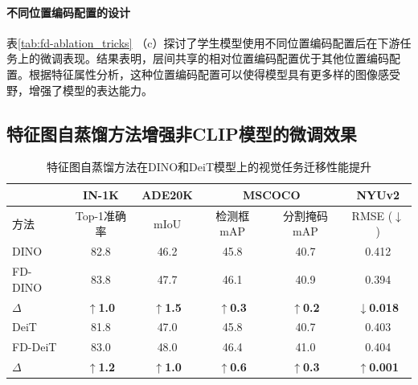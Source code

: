 \paragraph{不同位置编码配置的设计} 表\ref{tab:fd-ablation_tricks} （c）探讨了学生模型使用不同位置编码配置后在下游任务上的微调表现。结果表明，层间共享的相对位置编码配置优于其他位置编码配置。根据特征属性分析，这种位置编码配置可以使得模型具有更多样的图像感受野，增强了模型的表达能力。

\subsection{特征图自蒸馏方法增强非CLIP模型的微调效果}
\label{sec:fd-more-models}


\begin{table}
\caption{
特征图自蒸馏方法在DINO和DeiT模型上的视觉任务迁移性能提升
}
\centering
  \begin{tabular}{lccccc}
\toprule
   & IN-1K & ADE20K & \multicolumn{2}{c}{MSCOCO} & NYUv2 \\
   \midrule
方法    &  Top-1准确率   &  mIoU  & 检测框mAP & 分割掩码mAP & RMSE\scriptsize{ ($\downarrow$)}\\
  \midrule
  DINO & 82.8 & 46.2 & 45.8 & 40.7 & 0.412 \\
  FD-DINO & 83.8 & 47.7 & 46.1 & 40.9 & 0.394 \\
  $\Delta$ & \textbf{$\uparrow$1.0} & \textbf{$\uparrow$1.5} & \textbf{$\uparrow$0.3} & \textbf{$\uparrow$0.2} & \textbf{$\downarrow$0.018} \\
  \midrule
  
  DeiT & 81.8 & 47.0 & 45.8 & 40.7 & 0.403 \\
  FD-DeiT & 83.0 & 48.0 & 46.4 & 41.0 & 0.404 \\
  $\Delta$ & \textbf{$\uparrow$1.2} & \textbf{$\uparrow$1.0} & \textbf{$\uparrow$0.6} & \textbf{$\uparrow$0.3} & \textbf{$\uparrow$0.001} \\
\bottomrule
  \end{tabular}
\label{tab:fd-extend_dino_deit}
\end{table}

